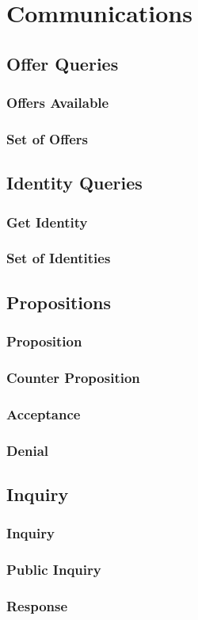\section{Communications}

\subsection{Offer Queries}

\subsubsection{Offers Available}

\subsubsection{Set of Offers}

\subsection{Identity Queries}

\subsubsection{Get Identity}

\subsubsection{Set of Identities}

\subsection{Propositions}

\subsubsection{Proposition}

\subsubsection{Counter Proposition}

\subsubsection{Acceptance}

\subsubsection{Denial}

\subsection{Inquiry}

\subsubsection{Inquiry}
\subsubsection{Public Inquiry}
\subsubsection{Response}
